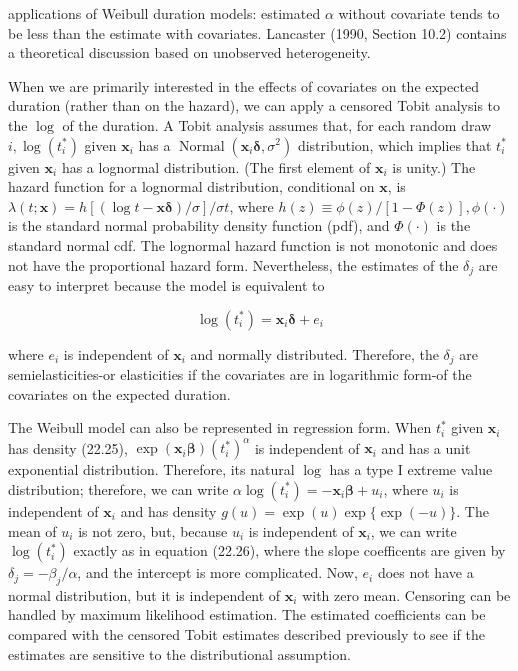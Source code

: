 \documentclass[10pt]{article}
\begin{document}
applications of Weibull duration models: estimated $\alpha$ without covariate tends to be less than the estimate with covariates. Lancaster (1990, Section 10.2) contains a theoretical discussion based on unobserved heterogeneity.

When we are primarily interested in the effects of covariates on the expected duration (rather than on the hazard), we can apply a censored Tobit analysis to the $\log$ of the duration. A Tobit analysis assumes that, for each random draw $i, \log \left(t_{i}^{*}\right)$ given $\mathbf{x}_{i}$ has a $\operatorname{Normal}\left(\mathbf{x}_{i} \boldsymbol{\delta}, \sigma^{2}\right)$ distribution, which implies that $t_{i}^{*}$ given $\mathbf{x}_{i}$ has a lognormal distribution. (The first element of $\mathbf{x}_{i}$ is unity.) The hazard function for a lognormal distribution, conditional on $\mathbf{x}$, is $\lambda(t ; \mathbf{x})=h[(\log t-\mathbf{x} \boldsymbol{\delta}) / \sigma] / \sigma t$, where $h(z) \equiv \phi(z) /[1-\Phi(z)], \phi(\cdot)$ is the standard normal probability density function (pdf), and $\Phi(\cdot)$ is the standard normal cdf. The lognormal hazard function is not monotonic and does not have the proportional hazard form. Nevertheless, the estimates of the $\delta_{j}$ are easy to interpret because the model is equivalent to


\begin{equation*}
\log \left(t_{i}^{*}\right)=\mathbf{x}_{i} \boldsymbol{\delta}+e_{i} \tag{22.26}
\end{equation*}


where $e_{i}$ is independent of $\mathbf{x}_{i}$ and normally distributed. Therefore, the $\delta_{j}$ are semielasticities-or elasticities if the covariates are in logarithmic form-of the covariates on the expected duration.

The Weibull model can also be represented in regression form. When $t_{i}^{*}$ given $\mathbf{x}_{i}$ has density (22.25), $\exp \left(\mathbf{x}_{i} \boldsymbol{\beta}\right)\left(t_{i}^{*}\right)^{\alpha}$ is independent of $\mathbf{x}_{i}$ and has a unit exponential distribution. Therefore, its natural $\log$ has a type I extreme value distribution; therefore, we can write $\alpha \log \left(t_{i}^{*}\right)=-\mathbf{x}_{i} \boldsymbol{\beta}+u_{i}$, where $u_{i}$ is independent of $\mathbf{x}_{i}$ and has density $g(u)=\exp (u) \exp \{\exp (-u)\}$. The mean of $u_{i}$ is not zero, but, because $u_{i}$ is independent of $\mathbf{x}_{i}$, we can write $\log \left(t_{i}^{*}\right)$ exactly as in equation (22.26), where the slope coefficents are given by $\delta_{j}=-\beta_{j} / \alpha$, and the intercept is more complicated. Now, $e_{i}$ does not have a normal distribution, but it is independent of $\mathbf{x}_{i}$ with zero mean. Censoring can be handled by maximum likelihood estimation. The estimated coefficients can be compared with the censored Tobit estimates described previously to see if the estimates are sensitive to the distributional assumption.
\end{document}
